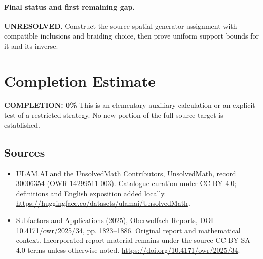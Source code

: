 \documentclass[11pt]{article}
\begin{document}
\paragraph{Final status and first remaining gap.}
\textbf{UNRESOLVED}. Construct the source spatial generator assignment with compatible inclusions and braiding choice, then prove uniform support bounds for it and its inverse.

\section{Completion Estimate}
\noindent\textbf{COMPLETION: 0\%}
This is an elementary auxiliary calculation or an explicit test of a restricted strategy. No new portion of the full source target is established.

\subsection{Sources}
\begin{itemize}
\item[\hypertarget{source:30006354:1}{S1}] ULAM.AI and the UnsolvedMath Contributors, UnsolvedMath, record 30006354 (OWR-14299511-003). Catalogue curation under CC BY 4.0; definitions and English exposition added locally.
\url{https://huggingface.co/datasets/ulamai/UnsolvedMath}.
\item[\hypertarget{source:30006354:2}{S2}] Subfactors and Applications (2025), Oberwolfach Reports, DOI 10.4171/owr/2025/34, pp. 1823--1886. Original report and mathematical context. Incorporated report material remains under the source CC BY-SA 4.0 terms unless otherwise noted.
\url{https://doi.org/10.4171/owr/2025/34}.
\end{itemize}
\label{end:30006354}
\end{document}
